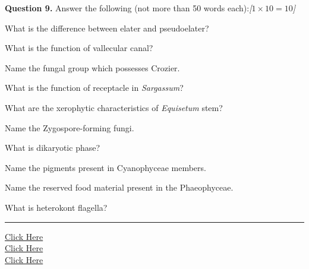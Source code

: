 \documentclass[11pt,a4paper]{article}
\newcommand{\pts}[1]{\hfill   \textit{[#1]}}
\begin{document}
\noindent   \textbf{Question 9.} Answer the following (not more than 50 words each):\pts{$1  \times 10 = 10$}

\begin{parts}
  \item What is the difference between elater and pseudoelater?
  \item What is the function of vallecular canal?
  \item Name the fungal group which possesses Crozier.
  \item What is the function of receptacle in   \textit{Sargassum}?
  \item What are the xerophytic characteristics of   \textit{Equisetum} stem?
  \item Name the Zygospore-forming fungi.
  \item What is dikaryotic phase?
  \item Name the pigments present in Cyanophyceae members.
  \item Name the reserved food material present in the Phaeophyceae.
  \item What is heterokont flagella?
\end{parts}

\vfill
\rule{\linewidth}{0.4pt}

\begin{center}\small
\href{https://bhu-exam.vercel.app/}{Click Here}\\[4pt]\href{https://me-aryan.vercel.app/}{Click Here}\\[4pt]\href{https://quashan-me.vercel.app/}{Click Here}
\end{center}
\end{document}
